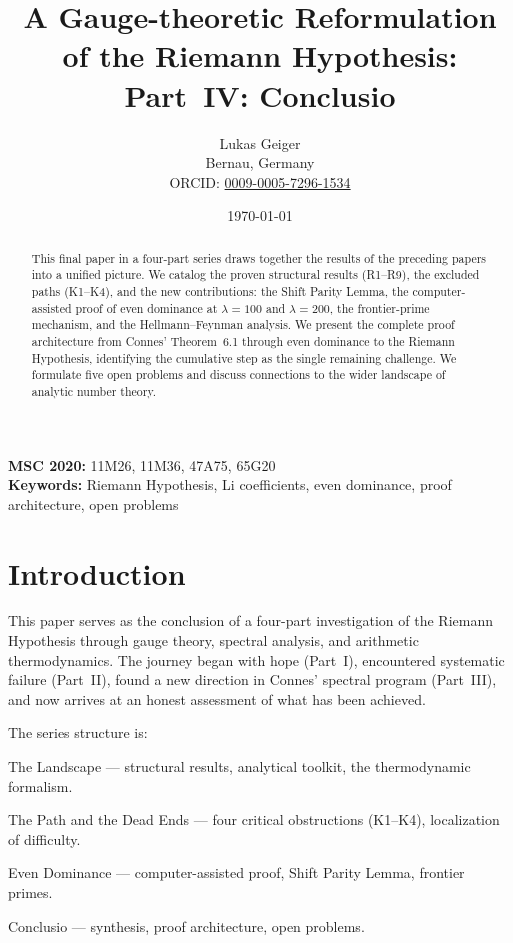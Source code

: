 \documentclass[12pt,a4paper]{article}
\title{A Gauge-theoretic Reformulation of the Riemann Hypothesis:\\
Part~IV: Conclusio}
\author{Lukas Geiger\\
\small Bernau, Germany\\
\small ORCID: \href{https://orcid.org/0009-0005-7296-1534}{0009-0005-7296-1534}}
\date{\today}
\theoremstyle{definition}
\theoremstyle{remark}
\begin{document}
\maketitle

\begin{abstract}
This final paper in a four-part series draws together the results of the preceding papers into a unified picture. We catalog the proven structural results (R1--R9), the excluded paths (K1--K4), and the new contributions: the Shift Parity Lemma, the computer-assisted proof of even dominance at $\lambda = 100$ and $\lambda = 200$, the frontier-prime mechanism, and the Hellmann--Feynman analysis. We present the complete proof architecture from Connes' Theorem~6.1 through even dominance to the Riemann Hypothesis, identifying the cumulative step as the single remaining challenge. We formulate five open problems and discuss connections to the wider landscape of analytic number theory.
\end{abstract}

\noindent\textbf{MSC 2020:} 11M26, 11M36, 47A75, 65G20\\
\textbf{Keywords:} Riemann Hypothesis, Li coefficients, even dominance, proof architecture, open problems

\tableofcontents


\section{Introduction}
\label{sec:intro}

This paper serves as the conclusion of a four-part investigation of the Riemann Hypothesis through gauge theory, spectral analysis, and arithmetic thermodynamics. The journey began with hope (Part~I), encountered systematic failure (Part~II), found a new direction in Connes' spectral program (Part~III), and now arrives at an honest assessment of what has been achieved.

The series structure is:
\begin{description}[font=\bfseries,leftmargin=2em]
  \item[Part~I \cite{Geiger2026partI}:] The Landscape --- structural results, analytical toolkit, the thermodynamic formalism.
  \item[Part~II \cite{Geiger2026partII}:] The Path and the Dead Ends --- four critical obstructions (K1--K4), localization of difficulty.
  \item[Part~III \cite{Geiger2026partIII}:] Even Dominance --- computer-assisted proof, Shift Parity Lemma, frontier primes.
  \item[Part~IV (this paper):] Conclusio --- synthesis, proof architecture, open problems.
\end{description}
\end{document}
